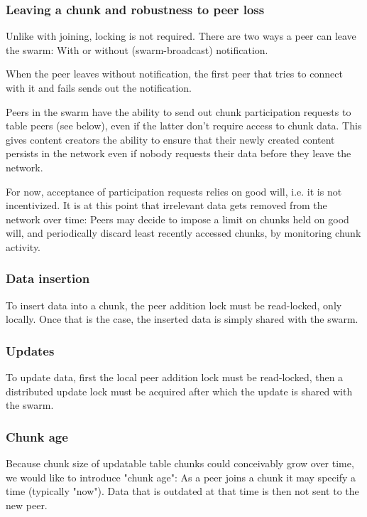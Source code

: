 \documentclass[a4paper, 10pt, conference]{ieeeconf}
\begin{document}
\subsubsection{Leaving a chunk and robustness to peer loss}

Unlike with joining, locking is not required. There are two ways a peer can leave
the swarm: With or without (swarm-broadcast) notification.

When the peer leaves without notification, the first peer that tries to connect
with it and fails sends out the notification.

Peers in the swarm have the ability to send out chunk participation requests
to table peers (see below), even if the latter don't require access to chunk
data. This gives content creators the ability to ensure that their newly created
content persists in the network even if nobody requests their data before they
leave the network. 

For now, acceptance of participation requests relies on good will, i.e. it is 
not incentivized. It is at this point that irrelevant data gets removed from the
network over time: Peers may decide to impose a limit on chunks held on good
will, and periodically discard least recently accessed chunks, by monitoring
chunk activity.

\subsubsection{Data insertion}

To insert data into a chunk, the peer addition lock must be read-locked, only 
locally. Once that is the case, the inserted data is simply shared with the 
swarm.

\subsubsection{Updates}

To update data, first the local peer addition lock must be read-locked, then a 
distributed update lock must be acquired after which the update is shared with 
the swarm.

\subsubsection{Chunk age}

Because chunk size of updatable table chunks could conceivably grow over time,
we would like to introduce "chunk age": As a peer joins a chunk it may specify
a time (typically "now"). Data that is outdated at that time is then not sent
to the new peer.
\end{document}
